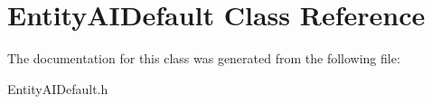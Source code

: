 \hypertarget{class_entity_a_i_default}{}\section{Entity\+A\+I\+Default Class Reference}
\label{class_entity_a_i_default}


The documentation for this class was generated from the following file\+:\begin{DoxyCompactItemize}
\item 
Entity\+A\+I\+Default.\+h\end{DoxyCompactItemize}
